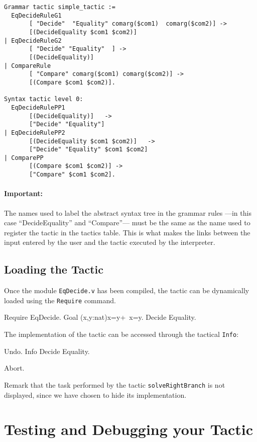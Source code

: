 \begin{verbatim}
Grammar tactic simple_tactic :=
  EqDecideRuleG1 
       [ "Decide"  "Equality" comarg($com1)  comarg($com2)] -> 
       [(DecideEquality $com1 $com2)]
| EqDecideRuleG2 
       [ "Decide" "Equality"  ] -> 
       [(DecideEquality)]
| CompareRule 
       [ "Compare" comarg($com1) comarg($com2)] -> 
       [(Compare $com1 $com2)].

Syntax tactic level 0:
  EqDecideRulePP1 
       [(DecideEquality)]   -> 
       ["Decide" "Equality"]
| EqDecideRulePP2 
       [(DecideEquality $com1 $com2)]   -> 
       ["Decide" "Equality" $com1 $com2]
| ComparePP 
       [(Compare $com1 $com2)] -> 
       ["Compare" $com1 $com2].
\end{verbatim}


\paragraph{Important:} The names used to label the abstract syntax tree 
in the grammar rules ---in this case ``DecideEquality'' and
``Compare''--- must be the same as the name used to register the
tactic in the tactics table. This is what makes the links between the
input entered by the user and the tactic executed by the interpreter.

\subsection{Loading the Tactic}

Once the module \texttt{EqDecide.v} has been compiled, the tactic can
be dynamically loaded using the \texttt{Require} command. 

\begin{coq_example}
Require EqDecide.
Goal (x,y:nat){x=y}+{~x=y}.
Decide Equality.
\end{coq_example}

The implementation of the tactic can be accessed through the
tactical \texttt{Info}:
\begin{coq_example}
Undo.
Info Decide Equality.
\end{coq_example}
\begin{coq_eval}
Abort.
\end{coq_eval}

Remark that the task performed by the tactic \texttt{solveRightBranch}
is not displayed, since we have chosen to hide its implementation.

\section[Testing and Debugging your Tactic]{Testing and Debugging your Tactic\label{test-and-debug}}

